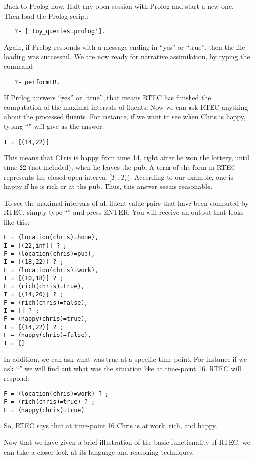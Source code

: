 Back to Prolog now. Halt any open session with Prolog and start a new one. Then load the Prolog script:

{\small
\begin{verbatim}
   ?- ['toy_queries.prolog'].
\end{verbatim}
}

Again, if Prolog responds with a message ending in ``yes'' or ``true'', then the file loading was successful. We are now ready for narrative assimilation, by typing the command

{\small
\begin{verbatim}
   ?- performER.
\end{verbatim}
}

If Prolog answers ``yes'' or ``true'', that means RTEC has finished the computation of the maximal intervals of fluents. Now we can ask RTEC anything about the processed fluents. For instance, if we want to see when Chris is happy, typing ``'' will give us the answer:

{\small
\begin{verbatim}
I = [(14,22)]
\end{verbatim}
}

This means that Chris is happy from time 14, right after he won the lottery, until time 22 (not included), when he leaves the pub. A term of the form  in RTEC represents the closed-open interval $\mathit{[T_s, T_e)}$. According to our example, one is happy if he is rich or at the pub. Thus, this answer seems reasonable.

To see the maximal intervals of all fluent-value pairs that have been computed by RTEC, simply type ``'' and press ENTER. You will receive an output that looks like this:

{\small
\begin{verbatim}
F = (location(chris)=home),
I = [(22,inf)] ? ;
F = (location(chris)=pub),
I = [(18,22)] ? ;
F = (location(chris)=work),
I = [(10,18)] ? ;
F = (rich(chris)=true),
I = [(14,20)] ? ;
F = (rich(chris)=false),
I = [] ? ;
F = (happy(chris)=true),
I = [(14,22)] ? ;
F = (happy(chris)=false),
I = []
\end{verbatim}
}

In addition, we can ask what was true at a specific time-point. For instance if we ask ``'' we will find out what was the situation like at time-point 16. RTEC will respond:

{\small
\begin{verbatim}
F = (location(chris)=work) ? ;
F = (rich(chris)=true) ? ;
F = (happy(chris)=true)
\end{verbatim}
}

So, RTEC says that at time-point 16 Chris is at work, rich, and happy.

Now that we have given a brief illustration of the basic functionality of RTEC, we can take a closer look at its language and reasoning techniques.